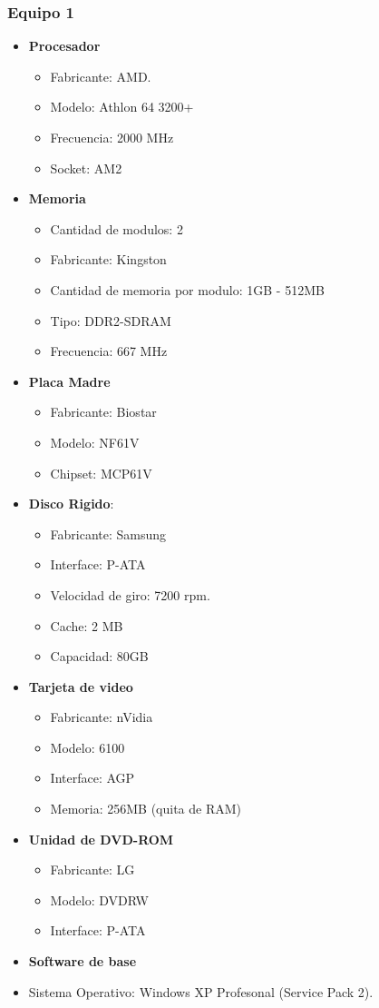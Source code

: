 \subsubsection{Equipo 1}
\begin{itemize}
\item \textbf{Procesador}
	\begin{itemize}
	\item Fabricante: AMD.	
	\item Modelo: Athlon 64 3200+
	\item Frecuencia: 2000 MHz
	\item Socket: AM2
	\end{itemize}
\item \textbf{Memoria}
	\begin{itemize}
	\item Cantidad de modulos: 2
	\item Fabricante: Kingston
	\item Cantidad de memoria por modulo: 1GB - 512MB
	\item Tipo: DDR2-SDRAM
	\item Frecuencia: 667 MHz
	\end{itemize}
\item \textbf{Placa Madre}
	\begin{itemize}
	\item Fabricante: Biostar 
	\item Modelo: NF61V
	\item Chipset: MCP61V
	\end{itemize}
\item \textbf{Disco Rigido}:
	\begin{itemize}
	\item Fabricante: Samsung
	\item Interface: P-ATA
	\item Velocidad de giro: 7200 rpm.
	\item Cache: 2 MB
	\item Capacidad: 80GB
	\end{itemize}
\item \textbf{Tarjeta de video}
	\begin{itemize}
	\item Fabricante: nVidia
	\item Modelo: 6100 
	\item Interface: AGP
	\item Memoria: 256MB (quita de RAM)
	\end{itemize}
\item \textbf{Unidad de DVD-ROM}
	\begin{itemize}
	\item Fabricante: LG
	\item Modelo: DVDRW
	\item Interface: P-ATA
	\end{itemize}
\item \textbf{Software de base}
	\item Sistema Operativo: Windows XP Profesonal (Service Pack 2).
\end{itemize} 
 
